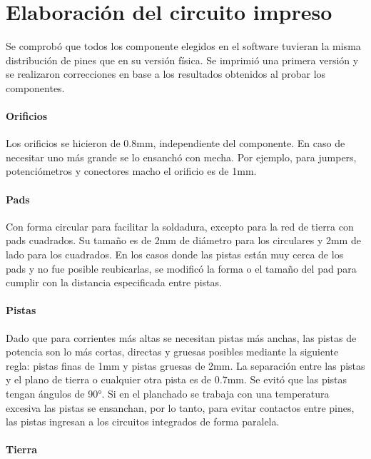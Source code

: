 \section{Elaboración del circuito impreso}

Se comprobó que todos los componente elegidos en el software tuvieran la misma distribución de pines que en su versión física. 
Se imprimió una primera versión y se realizaron correcciones en base a los resultados obtenidos al probar los componentes. 

\paragraph{Orificios}

Los orificios se hicieron de 0.8mm, independiente del componente. En caso de necesitar uno más grande se lo ensanchó con mecha.
Por ejemplo, para jumpers, potenciómetros y conectores macho el orificio es de 1mm. 

\paragraph{Pads}

Con forma circular para facilitar la soldadura, excepto para la red de tierra con pads cuadrados.
Su tamaño es de 2mm de diámetro para los circulares y 2mm de lado para los cuadrados.
En los casos donde las pistas están muy cerca de los pads y no fue posible reubicarlas,
se modificó la forma o el tamaño del pad para cumplir con la distancia especificada entre pistas.  

\paragraph{Pistas}

Dado que para corrientes más altas se necesitan pistas más anchas, las pistas de potencia son lo más cortas, directas y gruesas posibles mediante la siguiente regla:
pistas finas de 1mm y pistas gruesas de 2mm. 
La separación entre las pistas y el plano de tierra o cualquier otra pista es de 0.7mm. 
Se evitó que las pistas tengan ángulos de 90°. 
Si en el planchado se trabaja con una temperatura excesiva las pistas se ensanchan, por lo tanto,
para evitar contactos entre pines, las pistas ingresan a los circuitos integrados de forma paralela. 

\paragraph{Tierra} 

